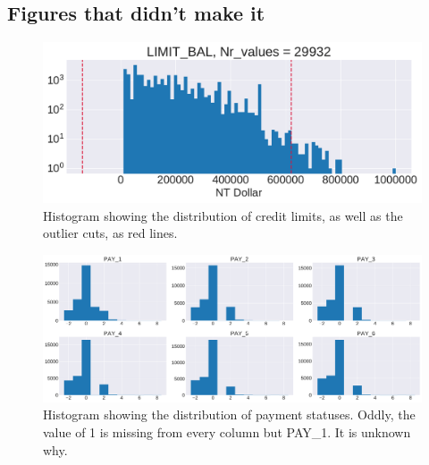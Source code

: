 \documentclass[10pt, twocolumn]{article}
\begin{document}
\onecolumn

\newpage
\begin{appendices}
\section{Figures that didn't make it}

\begin{figure}[h]
    \centering
    \includegraphics[scale=0.4]{../figs/CC_IQR_cuts_LIMIT_BAL.pdf}
    \caption{Histogram showing the distribution of credit limits, as well as the outlier cuts, as red lines.}
    \label{fig:app1}
\end{figure}

\begin{figure}[h]
    \centering
    \includegraphics[scale=0.4]{../figs/CC_PAY_hist.pdf}
    \caption{Histogram showing the distribution of payment statuses. Oddly, the value of 1 is missing from every column but PAY\_1. It is unknown why. }
    \label{fig:app2}
\end{figure}


\end{appendices}
\end{document}
